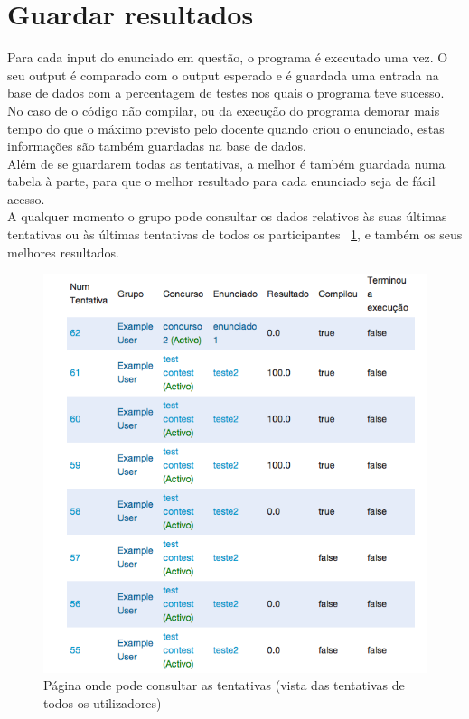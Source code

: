 \section{Guardar resultados}\label{sec res}
Para cada input do enunciado em questão, o programa é executado uma vez. O seu output é comparado com o output esperado e 
é guardada uma entrada na base de dados com a percentagem de testes nos quais o programa teve sucesso.\\
No caso de o código não compilar, ou da execução do programa demorar mais tempo do que o máximo previsto pelo docente quando 
criou o enunciado, estas informações são também guardadas na base de dados.\\
Além de se guardarem todas as tentativas, a melhor é também guardada numa tabela à parte, para que o melhor resultado para cada
enunciado seja de fácil acesso.\\
A qualquer momento o grupo pode consultar os dados relativos às suas últimas tentativas ou às últimas tentativas de todos os participantes ~\ref{img:tentativas}, e também os seus melhores resultados.\\

\begin{figure}[H]
\begin{center}
\includegraphics[scale=0.60]{Images/tentativas}
\caption{Página onde pode consultar as tentativas (vista das tentativas de todos os utilizadores)}\label{img:tentativas}
\end{center}
\end{figure}